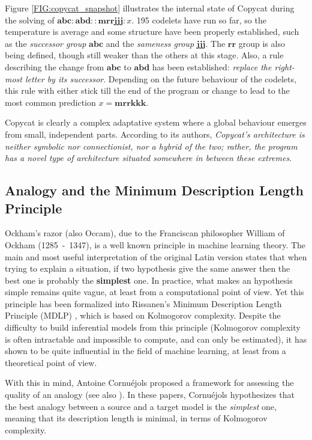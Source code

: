 Figure \ref{FIG:copycat_snapshot} illustrates the internal state of Copycat
during the solving of $\mathbf{abc} : \mathbf{abd} :: \mathbf{mrrjjj}: x$. 195
codelets have run so far, so the temperature is average and some structure have
been properly established, such as the \textit{successor group} $\mathbf{abc}$
and the \textit{sameness group} $\mathbf{jjj}$. The $\mathbf{rr}$ group is also
being defined, though still weaker than the others at this stage. Also, a rule
describing the change from $\mathbf{abc}$ to $\mathbf{abd}$ has been
established: \textit{replace the right-most letter by its successor}. Depending
on the future behaviour of the codelets, this rule with either stick till the
end of the program or change to lead to the most common prediction $x =
\mathbf{mrrkkk}$.

Copycat is clearly a complex adaptative system where a global behaviour emerges
from small, independent parts. According to its authors, \textit{Copycat's
architecture is neither symbolic nor connectionist, nor a hybrid of the two;
rather, the program has a novel type of architecture situated somewhere in
between these extremes}.

\subsection{Analogy and the Minimum Description Length Principle}

Ockham's razor (also Occam), due to the Franciscan philosopher William
of Ockham (1285~-~1347), is a well known principle in machine learning theory.
The main and most useful interpretation of the original Latin version states
that when trying to explain a situation, if two hypothesis give the same answer
then the best one is probably the \textbf{simplest} one. In practice, what
makes an hypothesis simple remains quite vague, at least from a computational
point of view. Yet this principle has been formalized into Rissanen's Minimum
Description Length Principle (MDLP) \cite{Ris78}, which is based on Kolmogorov
complexity. Despite the difficulty to build inferential models from this
principle (Kolmogorov complexity is often intractable and impossible to
compute, and can only be estimated), it has shown to be quite influential in
the field of machine learning, at least from a theoretical point of view.

With this in mind, Antoine Cornuéjols proposed a framework for assessing the
quality of an analogy \cite{CorMLS96} (see also \cite{CorJFA96}). In these
papers, Cornuéjols hypothesizes that the best analogy between a source and a
target model is the \textit{simplest} one, meaning that its description length
is minimal, in terms of Kolmogorov complexity.

